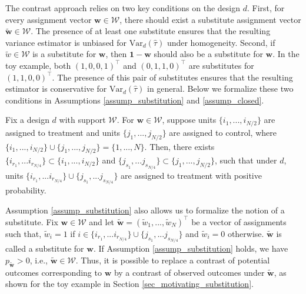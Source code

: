 \documentclass[12pt]{article}
\newcommand{\Var}{{\text{Var}}}
\begin{document}
The contrast approach relies on two key conditions on the design $d$. First, for every assignment vector $\bm{w} \in \mathcal{W}$, there should exist a substitute assignment vector $\tilde{\bm{w}} \in \mathcal{W}$. 
The presence of at least one substitute ensures that the resulting variance estimator is unbiased for $\Var_d(\hat{\tau})$ under homogeneity. Second, if $\tilde{w} \in \mathcal{W}$ is a substitute for $\bm{w}$, then $\bm{1} - \bm{w}$ should also be a substitute for $\bm{w}$. In the toy example, both $(1,0,0,1)^\top$ and $(0,1,1,0)^\top$ are substitutes for $(1,1,0,0)^\top$. The presence of this pair of substitutes ensures that the resulting estimator is conservative for $\Var_d(\hat{\tau})$ in general. Below we formalize these two conditions in Assumptions \ref{assump_substitution} and \ref{assump_closed}.
\begin{assumption} \normalfont
Fix a design $d$ with support $\mathcal{W}$. For $\bm{w} \in \mathcal{W}$, suppose units $\{i_1,...,i_{N/2}\}$ are assigned to treatment and units $\{j_1,...,j_{N/2}\}$ are assigned to control, where $\{i_1,...,i_{N/2}\} \cup \{j_1,...,j_{N/2}\} = \{1,...,N\}$. Then, there exists $\{i_{r_1},...i_{r_{N/4}}\} \subset \{i_1,...,i_{N/2}\}$ and $\{j_{s_1},...j_{s_{N/4}}\} \subset \{j_1,...,j_{N/2}\}$, such that under $d$, units $\{i_{r_1},...i_{r_{N/4}}\} \cup \{j_{s_1},...j_{s_{N/4}}\}$ are assigned to treatment with positive probability.
\label{assump_substitution}  
\end{assumption}
Assumption \ref{assump_substitution} also allows us to formalize the notion of a substitute. Fix $\bm{w}\in \mathcal{W}$ and let $\tilde{\bm{w}} = (\tilde{w}_1,...,\tilde{w}_N)^\top$ be a vector of assignments such that, $\tilde{w}_i = 1$ if $i \in \{i_{r_1},...i_{r_{N/4}}\} \cup \{j_{s_1},...j_{s_{N/4}}\}$ and $\tilde{w}_i = 0$ otherwise. $\tilde{\bm{w}}$ is called a substitute for $\bm{w}$. If Assumption \ref{assump_substitution} holds, we have $p_{\tilde{\bm{w}}}>0$, i.e., $\tilde{\bm{w}} \in \mathcal{W}$. Thus, it is possible to replace a contrast of potential outcomes corresponding to $\bm{w}$ by a contrast of observed outcomes under $\tilde{\bm{w}}$, as shown for the toy example in Section \ref{sec_motivating_substitution}. 
\end{document}
